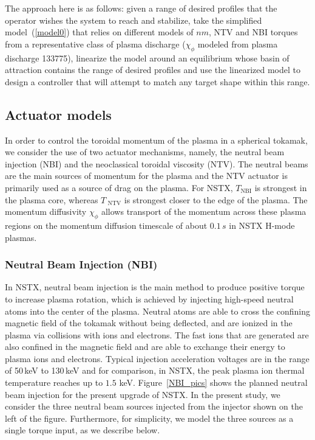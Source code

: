\documentclass[12pt,lot, lof]{puthesis}
\begin{document}
The approach here is as follows: given a range of desired profiles that
the operator wishes the system to reach and stabilize,
take the simplified model~(\ref{model0}) that relies on different models of $ n  m$,
NTV and NBI torques from a representative class of plasma discharge ($\chi_\phi$ modeled from plasma discharge 133775),
linearize the model around an equilibrium whose basin of attraction contains the range of desired profiles
and use the linearized model to design a controller that will attempt to match any target shape within this range.

\subsection{Actuator models}

In order to control the toroidal momentum of the plasma in a spherical tokamak, we consider the use of two actuator mechanisms, namely, the neutral beam injection (NBI) and the neoclassical toroidal viscosity (NTV). The neutral beams are the main sources of momentum for the plasma and the NTV actuator is primarily used as a source of drag on the plasma. For NSTX, $T_\text{NBI}$ is strongest  in the plasma core, whereas $T_\text{ NTV}$ is strongest closer to the edge of the plasma. The momentum diffusivity $\chi_\phi$ allows transport of the momentum across these plasma regions on the momentum diffusion timescale of about $0.1\,s$ in NSTX H-mode plasmas.


\subsubsection{Neutral Beam Injection (NBI)}
 \label{NBIAM}

In NSTX, neutral beam injection is the main method to produce positive torque to increase plasma rotation, which is achieved  by injecting high-speed neutral atoms into the center of the plasma. 
Neutral atoms are able to cross the confining magnetic field of the tokamak without being deflected, and are ionized in the plasma via collisions with ions and electrons. The fast ions that are generated are also confined in the magnetic field and are able to exchange their energy to plasma ions and electrons. Typical injection acceleration voltages are in the range of 50\,keV to 130\,keV and for comparison, in NSTX, the peak plasma ion thermal temperature reaches up to $1.5$ keV.
Figure~{\ref{NBI_pics}} shows the planned neutral beam injection for the present
upgrade of NSTX. In the present study, we consider the three neutral beam
sources injected from the injector shown on the left of the figure.
Furthermore, for simplicity, we model the three sources as a single torque
input, as we describe below.
\end{document}
